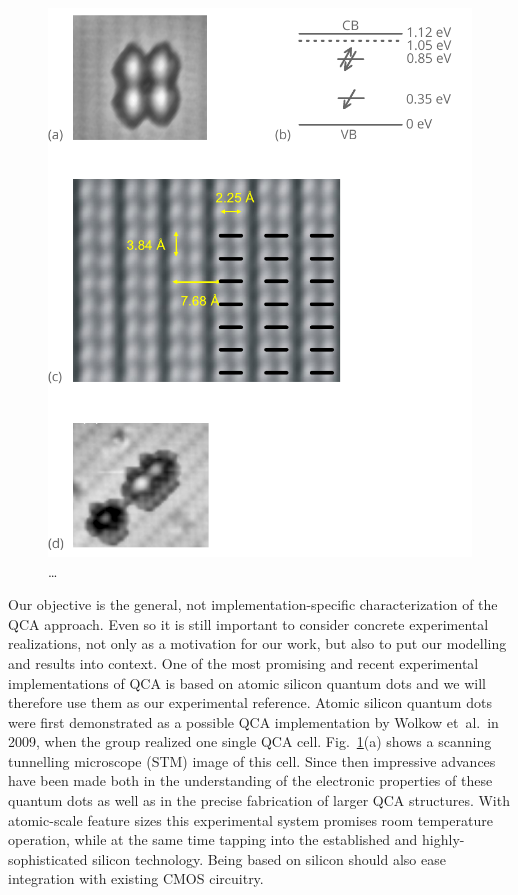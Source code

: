 \begin{figure}
  \center
  \includegraphics{silicon}
  \caption{\ldots}
  \label{fig:silicon}
\end{figure}


Our objective is the general, not implementation-specific characterization of
the QCA approach. Even so it is still important to consider concrete
experimental realizations, not only as a motivation for our work, but also to
put our modelling and results into context. One of the most promising and recent
experimental implementations of QCA is based on atomic silicon quantum dots and
we will therefore use them as our experimental reference. Atomic silicon quantum
dots were first demonstrated as a possible QCA implementation by Wolkow et~al.\
in 2009, when the group realized one single QCA cell. Fig.~\ref{fig:silicon}(a)
shows a scanning tunnelling microscope (STM) image of this cell. Since then
impressive advances have been made both in the understanding of the electronic
properties of these quantum dots as well as in the precise fabrication of larger
QCA structures. With atomic-scale feature sizes this experimental system
promises room temperature operation, while at the same time tapping into the
established and highly-sophisticated silicon technology. Being based on silicon
should also ease integration with existing CMOS circuitry.

